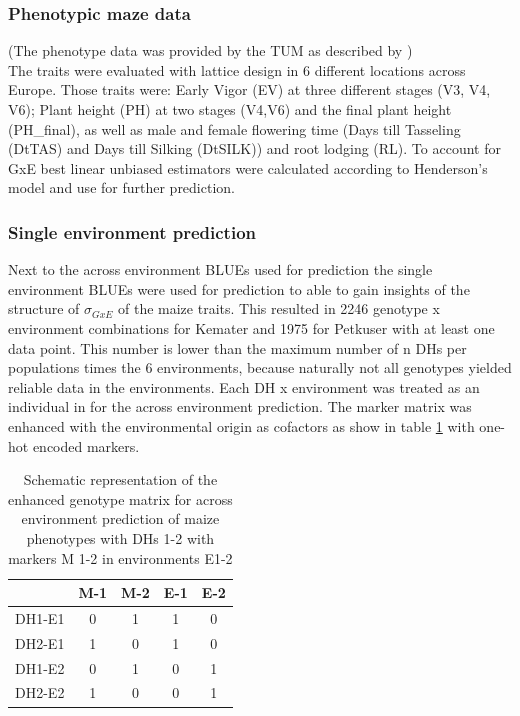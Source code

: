 \subsubsection{Phenotypic maze data}
(The phenotype data was provided by the TUM as described by \cite{holker2019european}) \\ The traits
were evaluated with lattice design in 6 different locations across Europe. Those traits were: Early Vigor
(EV) at three different stages (V3, V4, V6); Plant height (PH) at two stages (V4,V6) and the final plant
height (PH\_final), as well as male and female flowering time (Days till Tasseling (DtTAS) and Days till
Silking (DtSILK)) and root lodging (RL). To account for GxE best linear unbiased estimators were calculated
according to Henderson's model \cite{henderson1975best} and use for further prediction.

\subsubsection{Single environment prediction}
Next to the across environment BLUEs used for prediction the single environment BLUEs were used for prediction
to able to gain insights of the structure of $\sigma_{GxE}$ of the maize traits. This resulted in 2246
genotype x environment combinations for Kemater and 1975 for Petkuser with at least one data point. This
number is lower than the maximum number of n DHs per populations times the 6 environments, because naturally
not all genotypes yielded reliable data in the environments. Each DH x environment was treated as an
individual in for the across environment prediction. The marker matrix was enhanced with the environmental
origin as cofactors as show in table \ref{tab:envmarker} with one-hot encoded markers.

\onehalfspacing
\begin{table}[H]
 \centering
 \caption{Schematic representation of the enhanced genotype matrix for across environment prediction of maize phenotypes with DHs 1-2 with markers M 1-2 in environments E1-2}
 \label{tab:envmarker}
 \begin{tabular}{l|cccc}
  \toprule
      & M-1 & M-2 & E-1 & E-2 \\
  \midrule
  DH1-E1 & 0  & 1  & 1  & 0  \\
  DH2-E1 & 1  & 0  & 1  & 0  \\
  DH1-E2 & 0  & 1  & 0  & 1  \\
  DH2-E2 & 1  & 0  & 0  & 1  \\                      
  \bottomrule
 \end{tabular}
\end{table}
\doublespacing



